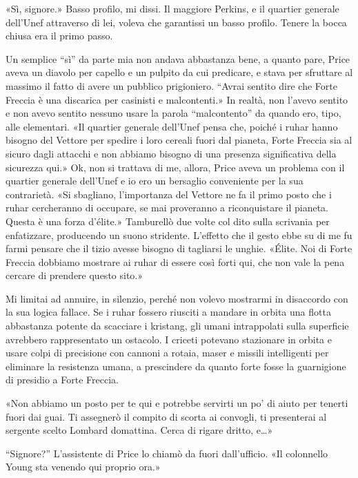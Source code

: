 «Sì, signore.» Basso profilo, mi dissi. Il maggiore Perkins, e il
quartier generale dell'Unef attraverso di lei, voleva che garantissi un
basso profilo. Tenere la bocca chiusa era il primo passo.

Un semplice ``sì'' da parte mia non andava abbastanza bene, a quanto
pare, Price aveva un diavolo per capello e un pulpito da cui predicare,
e stava per sfruttare al massimo il fatto di avere un pubblico
prigioniero. ``Avrai sentito dire che Forte Freccia è una discarica per
casinisti e malcontenti.» In realtà, non l'avevo sentito e non avevo
sentito nessuno usare la parola ``malcontento'' da quando ero, tipo,
alle elementari. «Il quartier generale dell'Unef pensa che, poiché i
ruhar hanno bisogno del Vettore per spedire i loro cereali fuori dal
pianeta, Forte Freccia sia al sicuro dagli attacchi e non abbiamo
bisogno di una presenza significativa della sicurezza qui.» Ok, non si
trattava di me, allora, Price aveva un problema con il quartier generale
dell'Unef e io ero un bersaglio conveniente per la sua contrarietà. «Si
sbagliano, l'importanza del Vettore ne fa il primo posto che i ruhar
cercheranno di occupare, se mai proveranno a riconquistare il pianeta.
Questa è una forza d'élite.» Tamburellò due volte col dito sulla
scrivania per enfatizzare, producendo un suono stridente. L'effetto che
il gesto ebbe su di me fu farmi pensare che il tizio avesse bisogno di
tagliarsi le unghie. «Élite. Noi di Forte Freccia dobbiamo mostrare ai
ruhar di essere così forti qui, che non vale la pena cercare di prendere
questo sito.»

Mi limitai ad annuire, in silenzio, perché non volevo mostrarmi in
disaccordo con la sua logica fallace. Se i ruhar fossero riusciti a
mandare in orbita una flotta abbastanza potente da scacciare i kristang,
gli umani intrappolati sulla superficie avrebbero rappresentato un
ostacolo. I criceti potevano stazionare in orbita e usare colpi di
precisione con cannoni a rotaia, maser e missili intelligenti per
eliminare la resistenza umana, a prescindere da quanto forte fosse la
guarnigione di presidio a Forte Freccia.

«Non abbiamo un posto per te qui e potrebbe servirti un po' di aiuto per
tenerti fuori dai guai. Ti assegnerò il compito di scorta ai convogli,
ti presenterai al sergente scelto Lombard domattina. Cerca di rigare
dritto, e\ldots»

``Signore?'' L'assistente di Price lo chiamò da fuori dall'ufficio. «Il
colonnello Young sta venendo qui proprio ora.»

